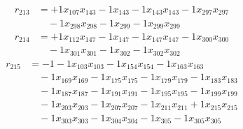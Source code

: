 \[\begin{aligned}
r_{213} &= + 1 x_{107} x_{143} - 1 x_{143} - 1 x_{143} x_{143} - 1 x_{297} x_{297} \\
 &\quad - 1 x_{298} x_{298} - 1 x_{299} - 1 x_{299} x_{299}
\end{aligned}\]
\[\begin{aligned}
r_{214} &= + 1 x_{112} x_{147} - 1 x_{147} - 1 x_{147} x_{147} - 1 x_{300} x_{300} \\
 &\quad - 1 x_{301} x_{301} - 1 x_{302} - 1 x_{302} x_{302}
\end{aligned}\]
\[\begin{aligned}
r_{215} &= - 1 - 1 x_{103} x_{103} - 1 x_{154} x_{154} - 1 x_{163} x_{163} \\
 &\quad - 1 x_{169} x_{169} - 1 x_{175} x_{175} - 1 x_{179} x_{179} - 1 x_{183} x_{183} \\
 &\quad - 1 x_{187} x_{187} - 1 x_{191} x_{191} - 1 x_{195} x_{195} - 1 x_{199} x_{199} \\
 &\quad - 1 x_{203} x_{203} - 1 x_{207} x_{207} - 1 x_{211} x_{211} + 1 x_{215} x_{215} \\
 &\quad - 1 x_{303} x_{303} - 1 x_{304} x_{304} - 1 x_{305} - 1 x_{305} x_{305}
\end{aligned}\]
\endgroup
